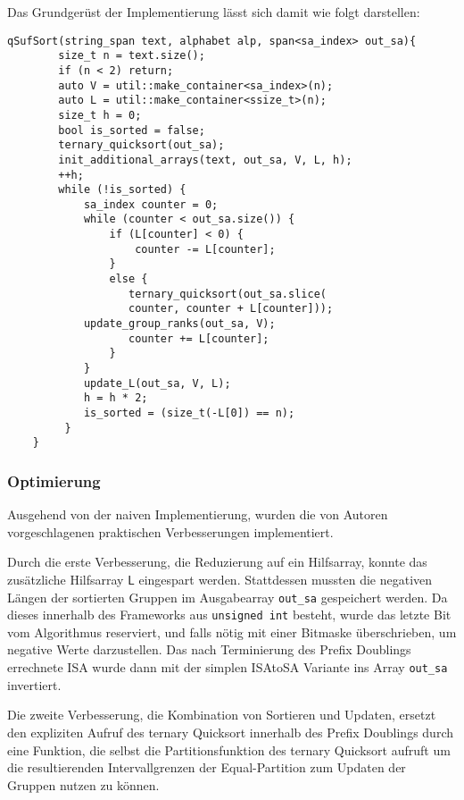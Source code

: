 Das Grundgerüst der Implementierung lässt sich damit wie folgt darstellen:

\newpage
\begin{samepage}
\begin{verbatim}
qSufSort(string_span text, alphabet alp, span<sa_index> out_sa){
        size_t n = text.size();
        if (n < 2) return;  
        auto V = util::make_container<sa_index>(n);
        auto L = util::make_container<ssize_t>(n);           
        size_t h = 0;
        bool is_sorted = false;
        ternary_quicksort(out_sa);
        init_additional_arrays(text, out_sa, V, L, h);
        ++h;
        while (!is_sorted) {
            sa_index counter = 0;
            while (counter < out_sa.size()) {
                if (L[counter] < 0) {
                    counter -= L[counter];
                }
                else {
                   ternary_quicksort(out_sa.slice(
                   counter, counter + L[counter]));
           	update_group_ranks(out_sa, V);
                   counter += L[counter];
                }
            }
            update_L(out_sa, V, L);
            h = h * 2;
            is_sorted = (size_t(-L[0]) == n);
         }
    }
\end{verbatim}
\end{samepage}
\subsubsection{Optimierung}
Ausgehend von der naiven Implementierung, wurden die von Autoren vorgeschlagenen praktischen Verbesserungen implementiert. 

Durch die erste Verbesserung, die Reduzierung auf ein Hilfsarray, konnte das zusätzliche Hilfsarray $\mathsf{L}$ eingespart werden. Stattdessen mussten die negativen Längen der sortierten Gruppen im Ausgabearray \texttt{out_sa} gespeichert werden. Da dieses innerhalb des Frameworks aus \texttt{unsigned int} besteht, wurde das letzte Bit vom Algorithmus reserviert, und falls nötig mit einer Bitmaske überschrieben, um \glqq negative\grqq{} Werte darzustellen. Das nach Terminierung des Prefix Doublings errechnete ISA wurde dann mit der simplen ISAtoSA Variante ins Array \texttt{out_sa} invertiert. 

Die zweite Verbesserung, die Kombination von Sortieren und Updaten, ersetzt den expliziten Aufruf des ternary Quicksort innerhalb des Prefix Doublings durch eine Funktion, die selbst die Partitionsfunktion des ternary Quicksort aufruft um die resultierenden Intervallgrenzen der Equal-Partition zum Updaten der Gruppen nutzen zu können.


